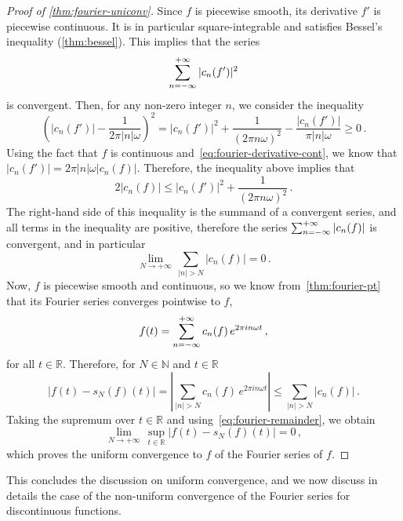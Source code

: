 \begin{proof}[Proof of \cref{thm:fourier-uniconv}]
  Since $f$ is piecewise smooth, its derivative $f'$ is piecewise continuous. It is in
  particular square-integrable and satisfies Bessel's inequality (\cref{thm:bessel}). This
  implies that the series
  \begin{equation}
    \sum_{n=-\infty}^{+\infty}|c_n(f')|^2
  \end{equation}
  is convergent. Then, for any non-zero integer $n$, we consider the inequality
  \begin{equation}
    \left(|c_n(f')|-\frac{1}{2\pi |n|\omega}\right)^2=|c_n(f')|^2
    +\frac{1}{(2\pi n\omega)^2}-\frac{|c_n(f')|}{\pi |n|\omega}\geq 0\,.
  \end{equation}
  Using the fact that $f$ is continuous and~\cref{eq:fourier-derivative-cont}, we know
  that $|c_n(f')|=2\pi|n|\omega |c_n(f)|$. Therefore, the inequality above implies that
  \begin{equation}
    2|c_n(f)|\leq |c_n(f')|^2
    +\frac{1}{(2\pi n\omega)^2}\,.
    \label{eq:fourier-remainder}
  \end{equation}
  The right-hand side of this inequality is the summand of a convergent series, and all
  terms in the inequality are positive, therefore the series $\sum_{n=-\infty}^{+\infty}|c_n(f)|$ is
  convergent, and in particular
  \begin{equation}
    \lim_{N\to+\infty}\,\sum_{|n|>N}|c_n(f)|=0\,.
  \end{equation}
  Now, $f$ is piecewise smooth and continuous, so we know from~\cref{thm:fourier-pt} that
  its Fourier series converges pointwise to $f$, \ie
  \begin{equation}
    f(t)=\sum_{n=-\infty}^{+\infty}c_n(f)\,e^{2\pi i n\omega t}\,,
  \end{equation}
  for all $t\in\mathbb{R}$. Therefore, for $N\in\mathbb{N}$ and $t\in\mathbb{R}$
  \begin{equation}
    |f(t)-s_N(f)(t)|=\left|\sum_{|n|>N}c_n(f)\,e^{2\pi i n\omega t}\right|
    \leq \sum_{|n|>N}|c_n(f)|\,.
  \end{equation}
  Taking the supremum over $t\in\mathbb{R}$ and using~\cref{eq:fourier-remainder}, we
  obtain
  \begin{equation}
    \lim_{N\to+\infty}\,\sup_{t\in\mathbb{R}}|f(t)-s_N(f)(t)|=0\,,
  \end{equation}
  which proves the uniform convergence to $f$ of the Fourier series of $f$.
\end{proof}
This concludes the discussion on uniform convergence, and we now discuss in details the
case of the non-uniform convergence of the Fourier series for discontinuous functions.
